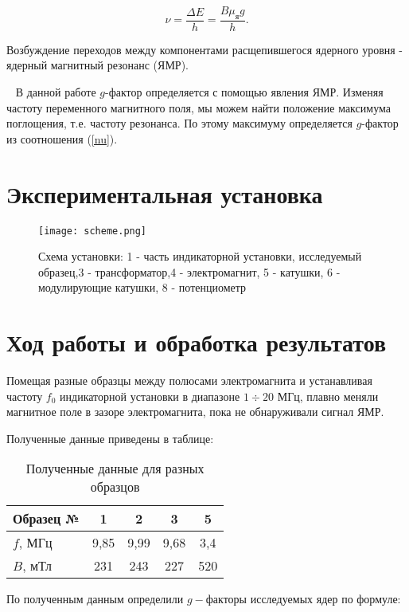 \documentclass[12pt,a4paper]{article}
\begin{document}
\begin{equation} \label{nu}
\nu = \frac{\Delta E}{h} = \frac{B \mu_\text{я} g}{h}.
\end{equation}

Возбуждение переходов между компонентами расщепившегося ядерного уровня - ядерный магнитный резонанс (ЯМР). 


~
В данной работе $g$-фактор определяется с помощью явления ЯМР. Изменяя частоту переменного магнитного поля, мы можем найти положение максимума поглощения, т.е. частоту резонанса. По этому максимуму определяется $g$-фактор из соотношения (\ref{nu}).

\section{Экспериментальная установка}

\begin{figure}[ht!]
 \centering
 {\texttt{[image: scheme.png]}}
\caption{Схема установки: 1 - часть индикаторной установки, исследуемый образец,3 - трансформатор,4 - электромагнит, 5 - катушки, 6 - модулирующие катушки, 8 - потенциометр }
\end{figure}


\section{Ход работы и обработка результатов}

Помещая разные образцы между полюсами электромагнита и устанавливая частоту $f_0$ индикаторной установки в диапазоне $1\div20$ МГц, плавно меняли магнитное поле в зазоре электромагнита, пока не обнаруживали сигнал ЯМР.

Полученные данные приведены в таблице:

\begin{table} [h]
	\centering
	\caption{Полученные данные для разных образцов}
	\begin{tabular}{|l||c|c|c|c|}
		\hline
		Образец № & 1 & 2 & 3 & 5 \\
		\hline
		$f$, МГц & 9,85 & 9,99 & 9,68 & 3,4 \\
		\hline
		$B$, мТл & 231 & 243 & 227 & 520 \\
		\hline
	\end{tabular}
\end{table}

По полученным данным определили $g-$факторы исследуемых ядер по формуле:
\end{document}
